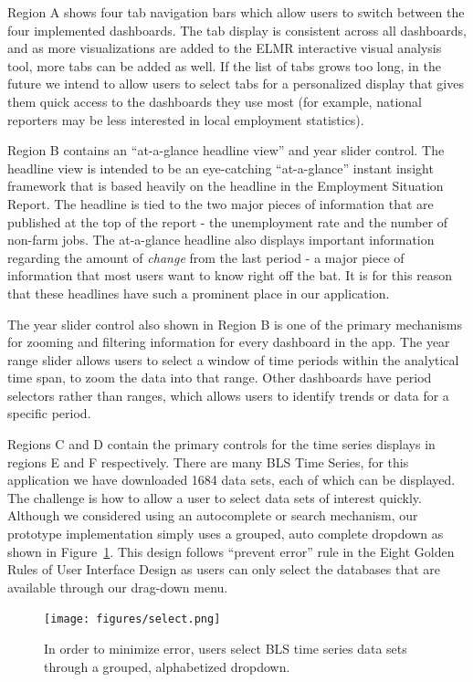 \documentclass{sigchi}
\begin{document}
Region A shows four tab navigation bars which allow users to switch between the four implemented dashboards. The tab display is consistent across all dashboards, and as more visualizations are added to the ELMR interactive visual analysis tool, more tabs can be added as well. If the list of tabs grows too long, in the future we intend to allow users to select tabs for a personalized display that gives them quick access to the dashboards they use most (for example, national reporters may be less interested in local employment statistics).

Region B contains an ``at-a-glance headline view'' and year slider control. The headline view is intended to be an eye-catching ``at-a-glance'' instant insight framework that is based heavily on the headline in the Employment Situation Report. The headline is tied to the two major pieces of information that are published at the top of the report - the unemployment rate and the number of non-farm jobs. The at-a-glance headline also displays important information regarding the amount of \textit{change} from the last period - a major piece of information that most users want to know right off the bat. It is for this reason that these headlines have such a prominent place in our application.

The year slider control also shown in Region B is one of the primary mechanisms for zooming and filtering information for every dashboard in the app. The year range slider allows users to select a window of time periods within the analytical time span, to zoom the data into that range. Other dashboards have period selectors rather than ranges, which allows users to identify trends or data for a specific period.

Regions C and D contain the primary controls for the time series displays in regions E and F respectively. There are many BLS Time Series, for this application we have downloaded 1684 data sets, each of which can be displayed. The challenge is how to allow a user to select data sets of interest quickly. Although we considered using an autocomplete or search mechanism, our prototype implementation simply uses a grouped, auto complete dropdown as shown in Figure~\ref{fig:select}. This design follows ``prevent error'' rule in the Eight Golden Rules of User Interface Design \cite{shneiderman_eight_????} as users can only select the databases that are available through our drag-down menu.

\begin{figure}[h]
    \centering
    \texttt{[image: figures/select.png]}
    \caption{In order to minimize error, users select BLS time series data sets through a grouped, alphabetized dropdown.}
    \label{fig:select}
\end{figure}
\end{document}

